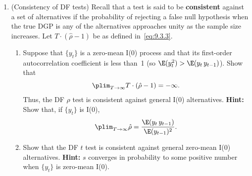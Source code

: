 \begin{enumerate}
\item (Consistency of DF tests) \enspace Recall that a test is said to be \textbf{consistent} against a
set of alternatives if the probability of rejecting a false null hypothesis when
the true DGP is any of the alternatives approaches unity as the sample size
increases. Let $T \cdot (\hat{\rho} - 1)$ be as defined in~\eqref{eq:9.3.3}.

\begin{enumerate}[label=(\alph*)]
\item Suppose that $\{y_t\}$ is a zero-mean I(0) process and that its first-order autocorrelation coefficient is less than~1 (so $\E(y_t^2) > \E(y_t\, y_{t-1})$). Show that
\[
\plim_{T \to \infty} T \cdot (\hat{\rho} - 1) = -\infty.
\]
Thus, the DF $\rho$ test is consistent against general I(0) alternatives. \textbf{Hint:}
Show that, if $\{y_t\}$ is I(0),
\[
\plim_{T \to \infty} \hat{\rho} = \frac{\E(y_t\, y_{t-1})}{\E(y_{t-1})^2}.
\]

\item Show that the DF $t$ test is consistent against general zero-mean I(0) alternatives. \textbf{Hint:} $s$ converges in probability to some positive number when $\{y_t\}$
is zero-mean I(0).
\end{enumerate}
\end{enumerate}
